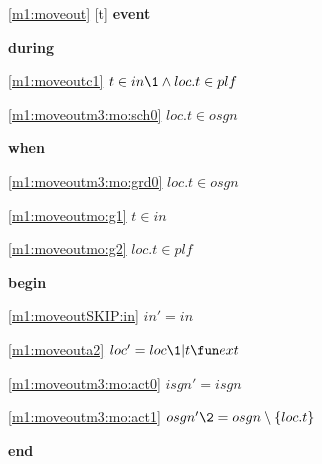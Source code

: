 \noindent \ref{m1:moveout} [t] \textbf{event}
\begin{block}
\item \textbf{during}
\begin{block}
\item[ \eqref{m1:moveoutc1} ]$t \in in  %
		\1\land loc.t \in plf $ %
\item[ \eqref{m1:moveoutm3:mo:sch0} ]$loc.t \in osgn $ %
\end{block}
\item \textbf{when}
\begin{block}
\item[ \eqref{m1:moveoutm3:mo:grd0} ]$loc.t \in osgn $ %
\item[ \eqref{m1:moveoutmo:g1} ]$t \in in $ %
\item[ \eqref{m1:moveoutmo:g2} ]$loc.t \in plf $ %
\end{block}
\item \textbf{begin}
\begin{block}
\item[ \eqref{m1:moveoutSKIP:in} ]$in' = in$ %
\item[ \eqref{m1:moveouta2} ]$loc' = loc \1 | t \fun ext $ %
\item[ \eqref{m1:moveoutm3:mo:act0} ]$isgn' = isgn$ %
\item[ \eqref{m1:moveoutm3:mo:act1} ]$osgn'  \2 = osgn  %
	\setminus \{ loc.t \} $ %
\end{block}
\item \textbf{end} \\
\end{block}
